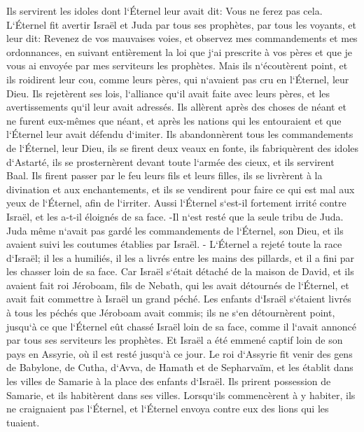 \verse Ils servirent les idoles dont l`Éternel leur avait dit: Vous ne ferez pas cela. 
\verse L`Éternel fit avertir Israël et Juda par tous ses prophètes, par tous les voyants, et leur dit: Revenez de vos mauvaises voies, et observez mes commandements et mes ordonnances, en suivant entièrement la loi que j`ai prescrite à vos pères et que je vous ai envoyée par mes serviteurs les prophètes. 
\verse Mais ils n`écoutèrent point, et ils roidirent leur cou, comme leurs pères, qui n`avaient pas cru en l`Éternel, leur Dieu. 
\verse Ils rejetèrent ses lois, l`alliance qu`il avait faite avec leurs pères, et les avertissements qu`il leur avait adressés. Ils allèrent après des choses de néant et ne furent eux-mêmes que néant, et après les nations qui les entouraient et que l`Éternel leur avait défendu d`imiter. 
\verse Ils abandonnèrent tous les commandements de l`Éternel, leur Dieu, ils se firent deux veaux en fonte, ils fabriquèrent des idoles d`Astarté, ils se prosternèrent devant toute l`armée des cieux, et ils servirent Baal. 
\verse Ils firent passer par le feu leurs fils et leurs filles, ils se livrèrent à la divination et aux enchantements, et ils se vendirent pour faire ce qui est mal aux yeux de l`Éternel, afin de l`irriter. 
\verse Aussi l`Éternel s`est-il fortement irrité contre Israël, et les a-t-il éloignés de sa face. -Il n`est resté que la seule tribu de Juda. 
\verse Juda même n`avait pas gardé les commandements de l`Éternel, son Dieu, et ils avaient suivi les coutumes établies par Israël. - 
\verse L`Éternel a rejeté toute la race d`Israël; il les a humiliés, il les a livrés entre les mains des pillards, et il a fini par les chasser loin de sa face. 
\verse Car Israël s`était détaché de la maison de David, et ils avaient fait roi Jéroboam, fils de Nebath, qui les avait détournés de l`Éternel, et avait fait commettre à Israël un grand péché. 
\verse Les enfants d`Israël s`étaient livrés à tous les péchés que Jéroboam avait commis; ils ne s`en détournèrent point, 
\verse jusqu`à ce que l`Éternel eût chassé Israël loin de sa face, comme il l`avait annoncé par tous ses serviteurs les prophètes. Et Israël a été emmené captif loin de son pays en Assyrie, où il est resté jusqu`à ce jour. 
\verse Le roi d`Assyrie fit venir des gens de Babylone, de Cutha, d`Avva, de Hamath et de Sepharvaïm, et les établit dans les villes de Samarie à la place des enfants d`Israël. Ils prirent possession de Samarie, et ils habitèrent dans ses villes. 
\verse Lorsqu`ils commencèrent à y habiter, ils ne craignaient pas l`Éternel, et l`Éternel envoya contre eux des lions qui les tuaient. 
